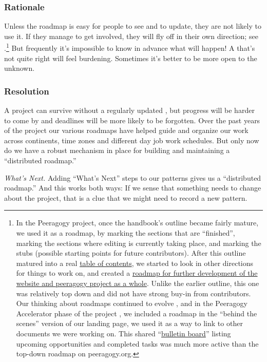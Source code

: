 \subsubsection*{Rationale} Unless the roadmap is easy for people to see and to update, they are not likely to use it.  If they manage to get involved, they will fly off in their own direction; see .\footnote{In the Peeragogy project, once the handbook's outline became fairly mature, we used it as a roadmap, by marking the sections that are ``finished'', marking the sections where editing is currently taking place, and marking the stubs (possible starting points for future contributors). After this outline matured into a real \href{http://peeragogy.org/table-of-contents/}{table of contents}, we started to look in other directions for things to work on, and created a \href{http://peeragogy.org/peeragogy-org-roadmap/}{roadmap for further development of the website and peeragogy project as a whole}.  Unlike the earlier outline, this one was relatively top down and did not have strong buy-in from contributors.  Our thinking about roadmaps continued to evolve \cite{corneli2013roadmaps}, and in the Peeragogy Accelerator phase of the project \cite{building-peeragogy-accelerator}, we included a roadmap in the ``behind the scenes'' version of our landing page, we used it as a way to link to other documents we were working on.  This shared ``\href{https://docs.google.com/document/d/1RZEsqFDwF-jPiCvgWzJgi6n6faTRTDuPQS1CMEeXxRE/edit\#heading=h.p197njr3jsn8}{bulletin board}'' listing upcoming opportunities and completed tasks was much more active than the top-down roadmap on peeragogy.org.}  But frequently it's impossible to know in advance what will happen! A  that's not quite right will feel burdening. Sometimes it's better to be more open to the unknown.

\subsubsection*{Resolution}
A project can survive without a regularly updated , but progress will be harder to come by and deadlines will be more likely to be forgotten.  Over the past years of the project our various roadmaps have helped guide and organize our work across continents, time zones and different day job work schedules.  But only now do we have a robust mechanism in place for building and maintaining a ``distributed roadmap.''

\begin{framed}
\emph{What's Next.}
Adding ``What's Next'' steps to our patterns gives us a ``distributed roadmap.''  And this works both ways: If we sense that something needs to change about the project, that is a clue that we might need to record a new pattern.
\end{framed}

\endgroup